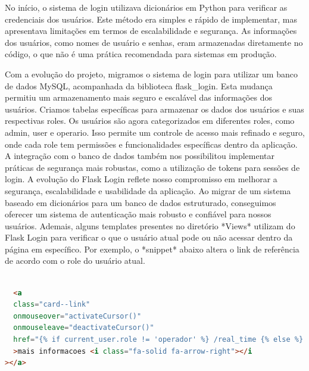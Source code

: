 \documentclass[conference, a4paper, 12pt]{IEEEtran}
\begin{document}
No início, o sistema de login utilizava dicionários em Python para verificar as credenciais dos usuários. Este método era simples e rápido de implementar, mas apresentava limitações em termos de escalabilidade e segurança.
As informações dos usuários, como nomes de usuário e senhas, eram armazenadas diretamente no código, o que não é uma prática recomendada para sistemas em produção.

Com a evolução do projeto, migramos o sistema de login para utilizar um banco de dados MySQL, acompanhada da biblioteca flask\_login. Esta mudança permitiu um armazenamento mais seguro e escalável das informações dos usuários.
Criamos tabelas específicas para armazenar os dados dos usuários e suas respectivas roles. Os usuários são agora categorizados em diferentes roles, como admin, user e operario. Isso permite um controle de acesso mais refinado e seguro, onde cada role tem permissões e funcionalidades específicas dentro da aplicação.
A integração com o banco de dados também nos possibilitou implementar práticas de segurança mais robustas, como a utilização de tokens para sessões de login.
A evolução do Flask Login reflete nosso compromisso em melhorar a segurança, escalabilidade e usabilidade da aplicação. Ao migrar de um sistema baseado em dicionários para um banco de dados estruturado, conseguimos oferecer um sistema de autenticação mais robusto e confiável para nossos usuários.
Ademais, alguns templates presentes no diretório *Views* utilizam do Flask Login para verificar o que o usuário atual pode ou não acessar dentro da página em específico. Por exemplo, o *snippet* abaixo altera o link de referência de acordo com o role do usuário atual.
\vspace{10pt}
\begin{lstlisting}[language=html, caption=Snippet de home.html]

  <a
  class="card--link"
  onmouseover="activateCursor()"
  onmouseleave="deactivateCursor()"
  href="{% if current_user.role != 'operador' %} /real_time {% else %} /data_history {% endif %}"
  >mais informacoes <i class="fa-solid fa-arrow-right"></i
></a>

\end{lstlisting}
\end{document}
